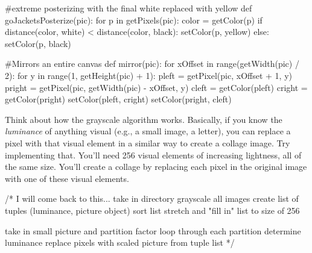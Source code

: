 \begin{exercises}
\begin{ex}
\begin{example}
#extreme posterizing with the final white replaced with yellow
def goJacketsPosterize(pic):
  for p in getPixels(pic):
    color = getColor(p)
    if distance(color, white) < distance(color, black):
      setColor(p, yellow)
    else:
      setColor(p, black)

#Mirrors an entire canvas
def mirror(pic):
  for xOffset in range(getWidth(pic) / 2):
    for y in range(1, getHeight(pic) + 1):
      pleft = getPixel(pic, xOffset + 1, y)
      pright = getPixel(pic, getWidth(pic) - xOffset, y)
      cleft = getColor(pleft)
      cright = getColor(pright)
      setColor(pleft, cright)
      setColor(pright, cleft)
\end{example}
\end{ex}

\begin{starex}
Think about how the grayscale algorithm works.  Basically, if you
know the \emph{luminance} of anything visual (e.g., a small image,
a letter), you can replace a pixel with that visual element in a
similar way to create a collage image.  Try implementing that.
You'll need 256 visual elements of increasing lightness, all of
the same size.  You'll create a collage by replacing each pixel in
the original image with one of these visual elements.

/* I will come back to this...
take in directory
grayscale all images
create list of tuples (luminance, picture object)
sort list
stretch and "fill in" list to size of 256

take in small picture and partition factor
loop through each partition
determine luminance
replace pixels with scaled picture from tuple list
*/
\end{starex}
\end{exercises}

